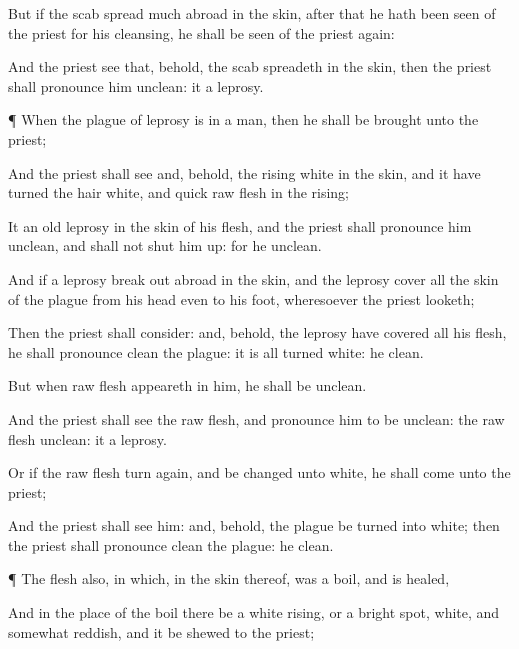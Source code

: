{But if the
scab spread
much
abroad in the
skin,
after that he hath been
seen of the
priest for his
cleansing, he shall be
seen of the
priest
again:

And
{} the
priest
see that, behold, the
scab
spreadeth in the
skin, then the
priest shall pronounce him
unclean: it
{} a
leprosy.


\par }{\PP {}¶ When the
plague of
leprosy is in a
man, then he shall be
brought unto the
priest;

And the
priest shall
see
{} and, behold,
{} the
rising
{}
white in the
skin, and it have
turned the
hair
white, and
{}
quick
raw
flesh in the
rising;

It
{} an
old
leprosy in the
skin of his
flesh, and the
priest shall pronounce him
unclean, and shall not
shut him up: for he
{}
unclean.

And if a
leprosy break
out
abroad in the
skin, and the
leprosy
cover all the
skin of
{} the
plague from his
head even to his
foot, wheresoever the
priest
looketh;

Then the
priest shall
consider: and, behold,
{} the
leprosy have
covered all his
flesh, he shall pronounce
{}
clean
{} the
plague: it is all
turned
white: he
{}
clean.

But
when
raw
flesh
appeareth in him, he shall be
unclean.

And the
priest shall
see the
raw
flesh, and pronounce him to be
unclean:
{} the
raw
flesh
{}
unclean: it
{} a
leprosy.

Or if the
raw
flesh turn
again, and be
changed unto
white, he shall
come unto the
priest;

And the
priest shall
see him: and, behold,
{} the
plague be
turned into
white; then the
priest shall pronounce
{}
clean
{} the
plague: he
{}
clean.


\par }{\PP {}¶ The
flesh also, in
which,
{} in the
skin thereof, was a
boil, and is
healed,

And in the
place of the
boil there be a
white
rising, or a bright
spot,
white, and somewhat
reddish, and it be
shewed to the
priest;

}

